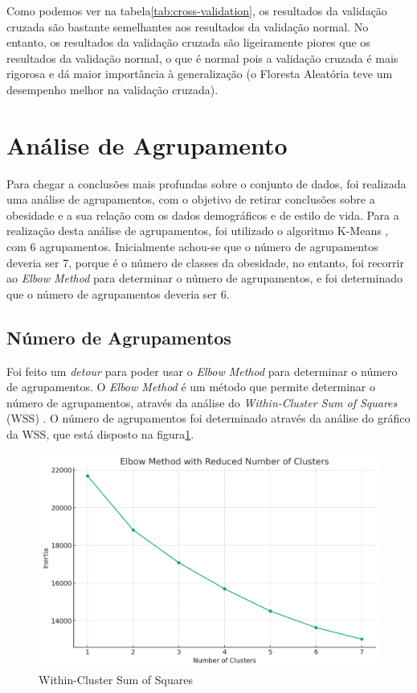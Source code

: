 \documentclass{easychair}
\begin{document}
Como podemos ver na tabela\ref{tab:cross-validation}, os resultados da validação cruzada são bastante semelhantes aos resultados da validação normal. No entanto, os resultados da validação cruzada são ligeiramente piores que os resultados da validação normal, o que é normal pois a validação cruzada é mais rigorosa e dá maior importância à generalização (o Floresta Aleatória teve um desempenho melhor na validação cruzada).

\section{Análise de Agrupamento}

Para chegar a conclusões mais profundas sobre o conjunto de dados, foi realizada uma análise de agrupamentos, com o objetivo de retirar conclusões sobre a obesidade e a sua relação com os dados demográficos e de estilo de vida. Para a realização desta análise de agrupamentos, foi utilizado o algoritmo K-Means \cite{kmeans}, com 6 agrupamentos. Inicialmente achou-se que o número de agrupamentos deveria ser 7, porque é o número de classes da obesidade, no entanto, foi recorrir ao \textit{Elbow Method} \cite{elbow-method} para determinar o número de agrupamentos, e foi determinado que o número de agrupamentos deveria ser 6.

\subsection{Número de Agrupamentos}

Foi feito um \textit{detour} para poder usar o \textit{Elbow Method} \cite{elbow-method} para determinar o número de agrupamentos. O \textit{Elbow Method} \cite{elbow-method} é um método que permite determinar o número de agrupamentos, através da análise do \textit{Within-Cluster Sum of Squares} (WSS) \cite{wss}. O número de agrupamentos foi determinado através da análise do gráfico da WSS, que está disposto na figura\ref{fig:wss}.

\begin{figure}[hbt!]
  \centering
  \begin{minipage}
    {\linewidth}
    \includegraphics[width=0.9\linewidth]{images/wss.jpg}
  \end{minipage}
  \caption{Within-Cluster Sum of Squares}
  \label{fig:wss}
\end{figure}
\end{document}
